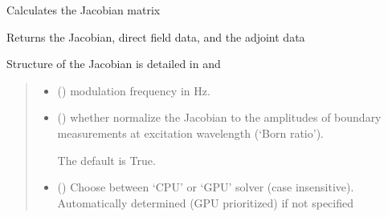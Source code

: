 \documentclass[letterpaper,10pt,english]{sphinxmanual}
\begin{document}
\begin{fulllineitems}
\begin{fulllineitems}
\label{\detokenize{_autosummary/nirfasterff.base.fluor_mesh.fluormesh:nirfasterff.base.fluor_mesh.fluormesh.jacobian}}
\pysigstartsignatures
{}
\pysigstopsignatures
\sphinxAtStartPar
Calculates the Jacobian matrix

\sphinxAtStartPar
Returns the Jacobian, direct field data, and the adjoint data

\sphinxAtStartPar
Structure of the Jacobian is detailed in {\hyperref[\detokenize{_autosummary/nirfasterff.inverse.jacobian_fl_CW:nirfasterff.inverse.jacobian_fl_CW}]{}} and {\hyperref[\detokenize{_autosummary/nirfasterff.inverse.jacobian_fl_FD:nirfasterff.inverse.jacobian_fl_FD}]{}}
\begin{quote}\begin{description}
\begin{itemize}
\item {} 
\sphinxAtStartPar
{} () \textendash{} modulation frequency in Hz.

\item {} 
\sphinxAtStartPar
{} (\sphinxstyleliteralemphasis{\sphinxupquote{, }}) \textendash{} 
\sphinxAtStartPar
whether normalize the Jacobian to the amplitudes of boundary measurements at excitation wavelength (‘Born ratio’).

\sphinxAtStartPar
The default is True.


\item {} 
\sphinxAtStartPar
{} (\sphinxstyleliteralemphasis{\sphinxupquote{, }}) \textendash{} Choose between ‘CPU’ or ‘GPU’ solver (case insensitive). Automatically determined (GPU prioritized) if not specified


\end{itemize}
\end{description}
\end{quote}
\end{fulllineitems}
\end{fulllineitems}
\end{document}
